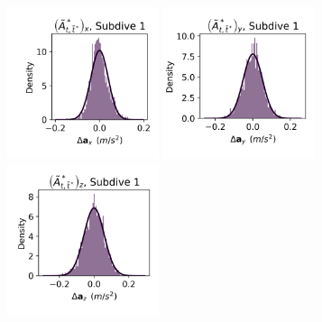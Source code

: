\documentclass{article}
\begin{document}
        \begin{center}
        \includegraphics[width=1.75in]{../Plots/2019/20190902-182840-CATs_OB_1_0_267_CarHMM_empirical_hist_Ax_0.png}
        \includegraphics[width=1.75in]{../Plots/2019/20190902-182840-CATs_OB_1_0_267_CarHMM_empirical_hist_Ay_0.png}
        \includegraphics[width=1.75in]{../Plots/2019/20190902-182840-CATs_OB_1_0_267_CarHMM_empirical_hist_Az_0.png}
        

\end{center}
\end{document}
